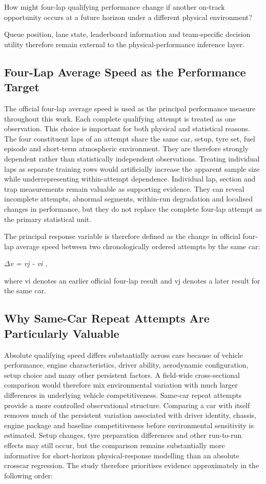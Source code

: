 How might four-lap qualifying performance change if another on-track opportunity occurs at a future horizon under a different physical environment?

Queue position, lane state, leaderboard information and team-specific decision utility therefore remain external to the physical-performance inference layer.

\subsection{Four-Lap Average Speed as the Performance Target}
The official four-lap average speed is used as the principal performance measure throughout this work. Each complete qualifying attempt is treated as one observation. This choice is important for both physical and statistical reasons. The four constituent laps of an attempt share the same car, setup, tyre set, fuel episode and short-term atmospheric environment. They are therefore strongly dependent rather than statistically independent observations. Treating individual laps as separate training rows would artificially increase the apparent sample size while underrepresenting within-attempt dependence. Individual lap, section and trap measurements remain valuable as supporting evidence. They can reveal incomplete attempts, abnormal segments, within-run degradation and localised changes in performance, but they do not replace the complete four-lap attempt as the primary statistical unit.

The principal response variable is therefore defined as the change in official four-lap average speed between two chronologically ordered attempts by the same car:

\begin{center}\textit{\ensuremath{\Delta}v = vj - vi ,}\end{center}

where vi denotes an earlier official four-lap result and vj denotes a later result for the same car.

\subsection{Why Same-Car Repeat Attempts Are Particularly Valuable}
Absolute qualifying speed differs substantially across cars because of vehicle performance, engine characteristics, driver ability, aerodynamic configuration, setup choice and many other persistent factors. A field-wide cross-sectional comparison would therefore mix environmental variation with much larger differences in underlying vehicle competitiveness. Same-car repeat attempts provide a more controlled observational structure. Comparing a car with itself removes much of the persistent variation associated with driver identity, chassis, engine package and baseline competitiveness before environmental sensitivity is estimated. Setup changes, tyre preparation differences and other run-to-run effects may still occur, but the comparison remains substantially more informative for short-horizon physical-response modelling than an absolute crosscar regression. The study therefore prioritises evidence approximately in the following order:

